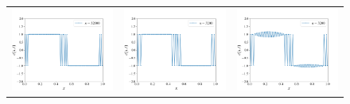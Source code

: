 \documentclass[12pt, reqno]{report}
\theoremstyle{definition}
\theoremstyle{remark}
\begin{document}
\begin{figure}[H]
\begin{tabular}{ccc}
        \includegraphics[width = \acfdwidth]{media_paper/very_stable_CH_CN_32000.png} &
        \includegraphics[width = \acfdwidth]{media_paper/stable_CH_CN_3200} &
        \includegraphics[width = \acfdwidth]{media_paper/unstable_CH_CN_3200} \\

\end{tabular}
\end{figure}
\end{document}

